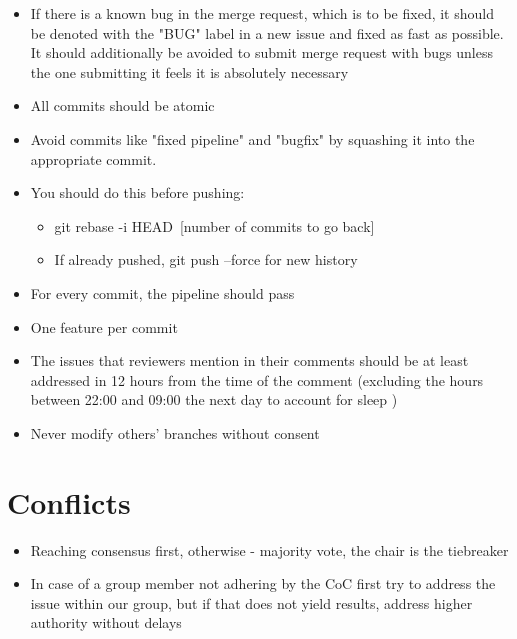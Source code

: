 \documentclass{article}
\begin{document}
\begin{itemize}
        \item If there is a known bug in the merge request, which is to be fixed, it should be denoted with the "BUG" label in a new issue and fixed as fast as possible. It should additionally be avoided to submit merge request with bugs unless the one submitting it feels it is absolutely necessary
        \item All commits should be atomic
        \item Avoid commits like "fixed pipeline" and "bugfix" by squashing it into the appropriate commit.
        \item You should do this before pushing:
            \begin{itemize}
                \item git rebase -i HEAD~[number of commits to go back]
                \item If already pushed, git push --force for new history
            \end{itemize}
        \item For every commit, the pipeline should pass
        \item One feature per commit
        \item The issues that reviewers mention in their comments should be at least addressed in 12 hours from the time of the comment (excluding the hours between 22:00 and 09:00 the next day to account for sleep )
        \item Never modify others' branches without consent
    \end{itemize}
\section{Conflicts}
    \begin{itemize}
        \item Reaching consensus first, otherwise - majority vote, the chair is the tiebreaker
        \item In case of a group member not adhering by the CoC first try to address the issue within our group, but if that does not yield results, address higher authority without delays
    \end{itemize}
\end{document}
